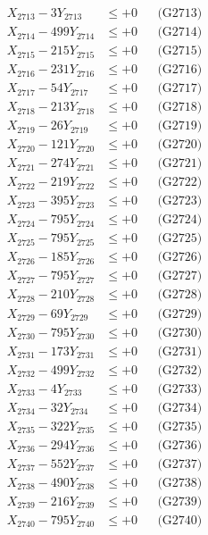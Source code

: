 \documentclass[a4paper,10pt]{article}
\begin{document}
{\begin{align}
X_{2713} - 3Y_{2713} &\leq +0 && \text{(G2713)} \\
X_{2714} - 499Y_{2714} &\leq +0 && \text{(G2714)} \\
X_{2715} - 215Y_{2715} &\leq +0 && \text{(G2715)} \\
X_{2716} - 231Y_{2716} &\leq +0 && \text{(G2716)} \\
X_{2717} - 54Y_{2717} &\leq +0 && \text{(G2717)} \\
X_{2718} - 213Y_{2718} &\leq +0 && \text{(G2718)} \\
X_{2719} - 26Y_{2719} &\leq +0 && \text{(G2719)} \\
X_{2720} - 121Y_{2720} &\leq +0 && \text{(G2720)} \\
\allowbreak
X_{2721} - 274Y_{2721} &\leq +0 && \text{(G2721)} \\
X_{2722} - 219Y_{2722} &\leq +0 && \text{(G2722)} \\
X_{2723} - 395Y_{2723} &\leq +0 && \text{(G2723)} \\
X_{2724} - 795Y_{2724} &\leq +0 && \text{(G2724)} \\
X_{2725} - 795Y_{2725} &\leq +0 && \text{(G2725)} \\
X_{2726} - 185Y_{2726} &\leq +0 && \text{(G2726)} \\
X_{2727} - 795Y_{2727} &\leq +0 && \text{(G2727)} \\
X_{2728} - 210Y_{2728} &\leq +0 && \text{(G2728)} \\
X_{2729} - 69Y_{2729} &\leq +0 && \text{(G2729)} \\
X_{2730} - 795Y_{2730} &\leq +0 && \text{(G2730)} \\
\allowbreak
X_{2731} - 173Y_{2731} &\leq +0 && \text{(G2731)} \\
X_{2732} - 499Y_{2732} &\leq +0 && \text{(G2732)} \\
X_{2733} - 4Y_{2733} &\leq +0 && \text{(G2733)} \\
X_{2734} - 32Y_{2734} &\leq +0 && \text{(G2734)} \\
X_{2735} - 322Y_{2735} &\leq +0 && \text{(G2735)} \\
X_{2736} - 294Y_{2736} &\leq +0 && \text{(G2736)} \\
X_{2737} - 552Y_{2737} &\leq +0 && \text{(G2737)} \\
X_{2738} - 490Y_{2738} &\leq +0 && \text{(G2738)} \\
X_{2739} - 216Y_{2739} &\leq +0 && \text{(G2739)} \\
X_{2740} - 795Y_{2740} &\leq +0 && \text{(G2740)} \\

\end{align}}
\end{document}
